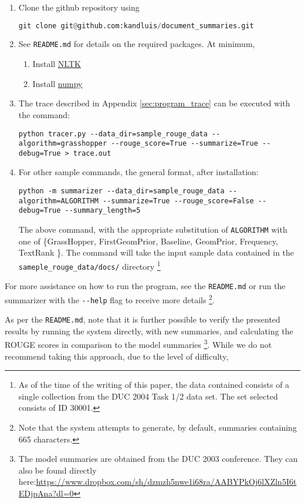 \documentclass[11pt]{article}
\begin{document}
\begin{enumerate}
\item Clone the github repository using 
\begin{lstlisting}[language=Python, caption="Git Clone Command"]
git clone git@github.com:kandluis/document_summaries.git
\end{lstlisting}
\item See \verb|README.md| for details on the required packages. At minimum, 
\begin{enumerate}
\item Install \href{http://www.nltk.org/}{NLTK}
\item Install \href{http://www.numpy.org/}{numpy}
\end{enumerate}
\item The trace described in Appendix \ref{sec:program_trace} can be executed with the command:
\begin{verbatim}
python tracer.py --data_dir=sample_rouge_data --algorithm=grasshopper --rouge_score=True --summarize=True --debug=True > trace.out
\end{verbatim}
\item For other sample commands, the general format, after installation:
\begin{verbatim}
python -m summarizer --data_dir=sample_rouge_data --algorithm=ALGORITHM --summarize=True --rouge_score=False --debug=True --summary_length=5
\end{verbatim}
The above command, with the appropriate substitution of \verb|ALGORITHM| with one of \{GrassHopper,  FirstGeomPrior, Baseline, GeomPrior, Frequency, TextRank \}. The command will take the input sample data contained in the \verb|sameple_rouge_data/docs/| directory \footnote{As of the time of the writing of this paper, the data contained consists of a single collection from the DUC 2004 Task 1/2 data set. The set selected consists of ID 30001.}
\end{enumerate}
For more assistance on how to run the program, see the \verb|README.md| or run the summarizer with the \verb|--help| flag to receive more details \footnote{Note that the system attempts to generate, by default, summaries containing 665 characters.}.

As per the \verb|README.md|, note that it is further possible to verify the presented results by running the system directly, with new summaries, and calculating the ROUGE scores in comparison to the model summaries \footnote{The model summaries are obtained from the DUC 2003 conference. They can also be found directly here:\href{https://www.dropbox.com/sh/dzmzh5nwe1i68ra/AABYPkOj6lXZln5I6tEDjpAna?dl=0}{https://www.dropbox.com/sh/dzmzh5nwe1i68ra/AABYPkOj6lXZln5I6tEDjpAna?dl=0}}. While we do not recommend taking this approach, due to the level of difficulty, 
\end{document}
